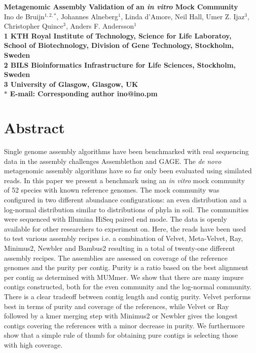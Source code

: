 \date{}

\pagestyle{myheadings}







\begin{flushleft}
{\Large
    \textbf{Metagenomic Assembly Validation of an {\em in vitro} Mock Community}
}
\\
Ino de Bruijn$^{1,2,\ast}$, 
Johannes Alneberg$^{1}$, 
Linda d'Amore,
Neil Hall,
Umer Z. Ijaz$^{3}$, 
Christopher Quince$^{3}$, 
Anders F. Andersson$^{1}$
\\
\bf{1} KTH Royal Institute of Technology, Science for Life Laboratoy, School of
Biotechnology, Division of Gene Technology, Stockholm, Sweden
\\
\bf{2} BILS Bioinformatics Infrastructure for Life Sciences, Stockholm, Sweden
\\
\bf{3} University of Glasgow, Glasgow, UK
\\
$\ast$ E-mail: Corresponding author ino@ino.pm
\end{flushleft}

\section*{Abstract}
Single genome assembly algorithms have been benchmarked with real
sequencing data in the assembly challenges Assemblethon and GAGE. The {\em de
novo} metagenomic assembly algorithms have so far only been evaluated using
similated reads. In this paper we present a benchmark using an {\em in vitro}
mock community of 52 species with known reference genomes. The mock community
was configured in two different abundance configurations: an even distribution
and a log-normal distribution similar to distributions of phyla in soil. The
communities were sequenced with Illumina HiSeq paired end mode. The data is
openly available for other researchers to experiment on. Here, the reads have
been used to test various assembly recipes i.e. a combination of Velvet,
Meta-Velvet, Ray, Minimus2, Newbler and Bambus2 resulting in a total of
twenty-one different assembly recipes. The assemblies are assessed on coverage of
the reference genomes and the purity per contig.  Purity is a ratio based on
the best alignment per contig as determined with MUMmer. We show that there are
many impure contigs constructed, both for the even community and the log-normal
community. There is a clear tradeoff between contig length and contig purity.
Velvet performs best in terms of purity and coverage of the references, while
Velvet or Ray followed by a kmer merging step with Minimus2 or Newbler gives
the longest contigs covering the references with a minor decrease in purity. We
furthermore show that a simple rule of thumb for obtaining pure contigs is
selecting those with high coverage.



